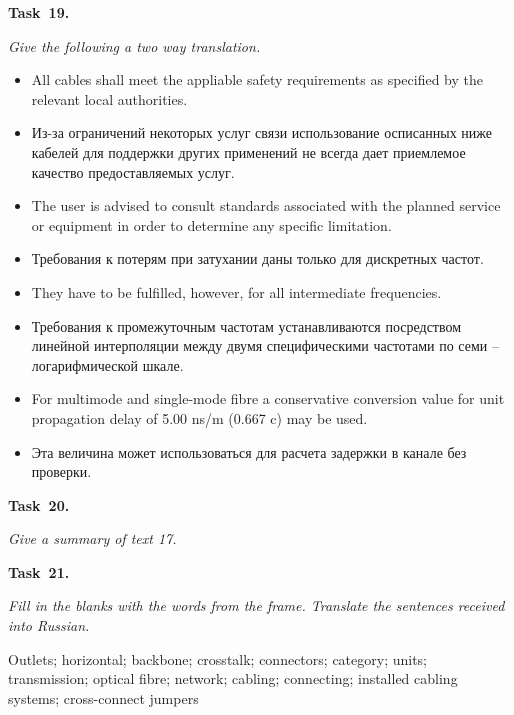 {\bf Task~19.}~~{\it Give the following a two way translation. \par}

\begin{itemize}
    \item {All cables shall meet the appliable safety requirements as specified by the relevant local
    authorities}.
    \item {Из-за ограничений некоторых услуг связи использование осписанных ниже кабелей
    для поддержки других применений не всегда дает приемлемое качество предоставляемых услуг}.
    \item {The user is advised to consult standards associated with the planned service or equipment in
    order to determine any specific limitation}.
    \item {Требования к потерям при затухании даны только для дискретных частот}.
    \item {They have to be fulfilled, however, for all intermediate frequencies}.
    \item {Требования к промежуточным частотам устанавливаются посредством линейной
    интерполяции между двумя специфическими частотами по семи -- логарифмической шкале}.
    \item {For multimode and single-mode fibre a conservative conversion value for unit propagation
    delay of 5.00 ns/m (0.667 c) may be used}.
    \item {Эта величина может использоваться для расчета задержки в канале без проверки}.
\end{itemize}

{\bf Task~20.}~~{\it Give a summary of text 17. \par}

{\bf Task~21.}~~{\it Fill in the blanks with the words from the frame. Translate the sentences received into Russian. \par}

\begin{framed}
    Outlets; horizontal; backbone; crosstalk; connectors; category; units; transmission; optical fibre;
    network; cabling; connecting; installed cabling systems; cross-connect jumpers
\end{framed}

